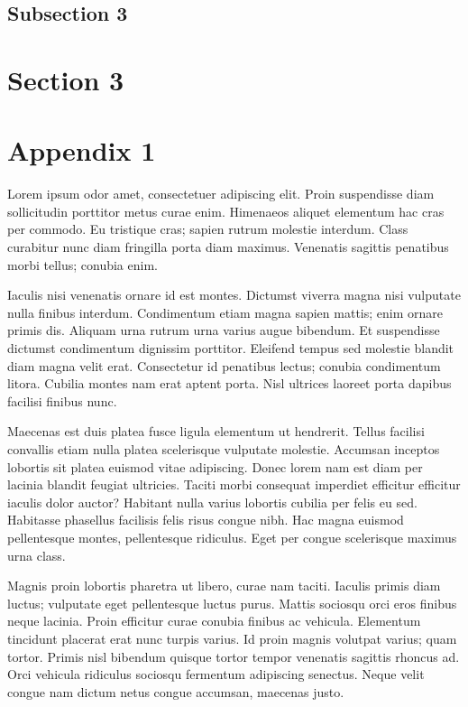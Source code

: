 \subsection{Subsection 3}

\section{Section 3}

\appendix
\section{Appendix 1}
Lorem ipsum odor amet, consectetuer adipiscing elit. Proin suspendisse diam
sollicitudin porttitor metus curae enim. Himenaeos aliquet elementum hac cras
per commodo. Eu tristique cras; sapien rutrum molestie interdum. Class
curabitur nunc diam fringilla porta diam maximus. Venenatis sagittis penatibus
morbi tellus; conubia enim.

Iaculis nisi venenatis ornare id est montes. Dictumst viverra magna nisi
vulputate nulla finibus interdum. Condimentum etiam magna sapien mattis; enim
ornare primis dis. Aliquam urna rutrum urna varius augue bibendum. Et
suspendisse dictumst condimentum dignissim porttitor. Eleifend tempus sed
molestie blandit diam magna velit erat. Consectetur id penatibus lectus;
conubia condimentum litora. Cubilia montes nam erat aptent porta. Nisl ultrices
laoreet porta dapibus facilisi finibus nunc.

Maecenas est duis platea fusce ligula elementum ut hendrerit. Tellus facilisi
convallis etiam nulla platea scelerisque vulputate molestie. Accumsan inceptos
lobortis sit platea euismod vitae adipiscing. Donec lorem nam est diam per
lacinia blandit feugiat ultricies. Taciti morbi consequat imperdiet efficitur
efficitur iaculis dolor auctor? Habitant nulla varius lobortis cubilia per
felis eu sed. Habitasse phasellus facilisis felis risus congue nibh. Hac magna
euismod pellentesque montes, pellentesque ridiculus. Eget per congue
scelerisque maximus urna class.

Magnis proin lobortis pharetra ut libero, curae nam taciti. Iaculis primis diam
luctus; vulputate eget pellentesque luctus purus. Mattis sociosqu orci eros
finibus neque lacinia. Proin efficitur curae conubia finibus ac vehicula.
Elementum tincidunt placerat erat nunc turpis varius. Id proin magnis volutpat
varius; quam tortor. Primis nisl bibendum quisque tortor tempor venenatis
sagittis rhoncus ad. Orci vehicula ridiculus sociosqu fermentum adipiscing
senectus. Neque velit congue nam dictum netus congue accumsan, maecenas justo.


